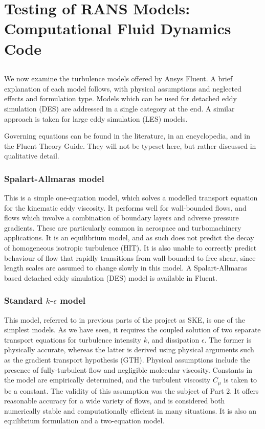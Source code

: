 \documentclass[11pt]{article}
\begin{document}
\section{Testing of RANS Models: Computational Fluid Dynamics Code}

\subsection{}

We now examine the turbulence models offered by Ansys Fluent. A brief explanation of each model follows, with physical assumptions and neglected effects and formulation type. Models which can be used for detached eddy simulation (DES) are addressed in a single category at the end. A similar approach is taken for large eddy simulation (LES) models.

Governing equations can be found in the literature, in an encyclopedia, and in the Fluent Theory Guide. They will not be typeset here, but rather discussed in qualitative detail.

\subsubsection{Spalart-Allmaras model}

This is a simple one-equation model, which solves a modelled transport equation for the kinematic eddy viscosity. It performs well for wall-bounded flows, and flows which involve a combination of boundary layers and adverse pressure gradients. These are particularly common in aerospace and turbomachinery applications. It is an equilibrium model, and as such does not predict the decay of homogeneous isotropic turbulence (HIT). It is also unable to correctly predict behaviour of flow that rapidly transitions from wall-bounded to free shear, since length scales are assumed to change slowly in this model. A Spalart-Allmaras based detached eddy simulation (DES) model is available in Fluent.

\subsubsection{Standard $k$-$\epsilon$ model}

This model, referred to in previous parts of the project as SKE, is one of the simplest models. As we have seen, it requires the coupled solution of two separate transport equations for turbulence intensity $k$, and dissipation $\epsilon$. The former is physically accurate, whereas the latter is derived using physical arguments such as the gradient transport hypothesis (GTH). Physical assumptions include the presence of fully-turbulent flow and negligible molecular viscosity. Constants in the model are empirically determined, and the turbulent viscosity $C_\mu$ is taken to be a constant. The validity of this assumption was the subject of Part 2. It offers reasonable accuracy for a wide variety of flows, and is considered both numerically stable and computationally efficient in many situations. It is also an equilibrium formulation and a two-equation model.
\end{document}
